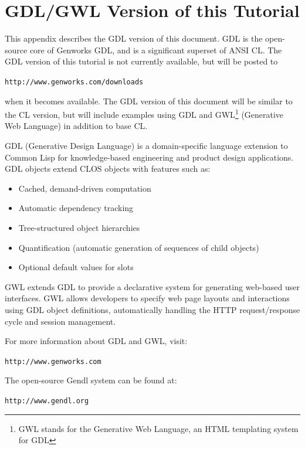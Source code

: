 \chapter{GDL/GWL Version of this Tutorial}

This appendix describes the GDL version of this document. GDL is the open-source core
of Genworks\textregistered{} GDL, and is a significant superset of ANSI CL. The GDL version of this
tutorial is not currently available, but will be posted to

\begin{center}
\texttt{http://www.genworks.com/downloads}
\end{center}

when it becomes available. The GDL version of this document will be similar to the CL version, but will include examples using GDL and GWL\footnote{GWL stands for the Generative Web Language, an HTML templating system for GDL} (Generative Web Language)
in addition to base CL.

GDL (Generative Design Language) is a domain-specific language extension to Common
Lisp for knowledge-based engineering and product design applications. GDL objects extend
CLOS objects with features such as:

\begin{itemize}
\item Cached, demand-driven computation
\item Automatic dependency tracking
\item Tree-structured object hierarchies
\item Quantification (automatic generation of sequences of child objects)
\item Optional default values for slots
\end{itemize}

GWL extends GDL to provide a declarative system for generating web-based user interfaces.
GWL allows developers to specify web page layouts and interactions using GDL object
definitions, automatically handling the HTTP request/response cycle and session management.

For more information about GDL and GWL, visit:

\begin{center}
\texttt{http://www.genworks.com}
\end{center}

The open-source Gendl system can be found at:

\begin{center}
\texttt{http://www.gendl.org}
\end{center}
